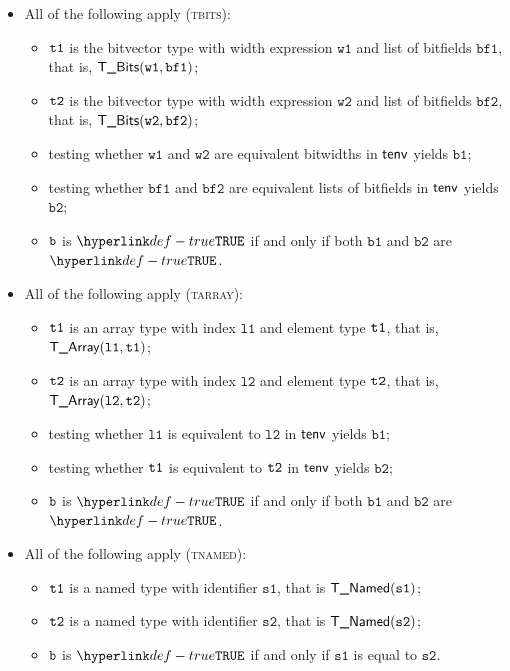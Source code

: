 \documentclass{book}
\newcommand\ProseOrTypeError[0]{\ProseTerminateAs{\TypeErrorConfig}}
\newcommand\vsone[0]{\texttt{s1}}
\newcommand\vstwo[0]{\texttt{s2}}
\newcommand\vwone[0]{\texttt{w1}}
\newcommand\vwtwo[0]{\texttt{w2}}
\newcommand\bfone[0]{\texttt{bf1}}
\newcommand\bftwo[0]{\texttt{bf2}}
\newcommand\vbone[0]{\texttt{b1}}
\newcommand\vbtwo[0]{\texttt{b2}}
\newcommand\vlone[0]{\texttt{l1}}
\newcommand\vltwo[0]{\texttt{l2}}
\begin{document}
\begin{itemize}
  \item All of the following apply (\textsc{tbits}):
  \begin{itemize}
    \item $\texttt{t1}$ is the bitvector type with width expression $\vwone$ and list of bitfields $\bfone$, that is, $\TBits(\vwone, \bfone)$;
    \item $\texttt{t2}$ is the bitvector type with width expression $\vwtwo$ and list of bitfields $\bftwo$, that is, $\TBits(\vwtwo, \bftwo)$;
    \item testing whether $\vwone$ and $\vwtwo$ are equivalent bitwidths in $\textsf{tenv}$ yields $\vbone$\ProseOrTypeError;
    \item testing whether $\bfone$ and $\bftwo$ are equivalent lists of bitfields in $\textsf{tenv}$ yields $\vbtwo$\ProseOrTypeError;
    \item $\texttt{b}$ is $\True$ if and only if both $\vbone$ and $\vbtwo$ are $\True$.
  \end{itemize}

  \item All of the following apply (\textsc{tarray}):
  \begin{itemize}
    \item $\texttt{t1}$ is an array type with index $\vlone$ and element type $\texttt{t1}$, that is, $\TArray(\vlone, \vtone)$;
    \item $\texttt{t2}$ is an array type with index $\vltwo$ and element type $\texttt{t2}$, that is, $\TArray(\vltwo, \vttwo)$;
    \item testing whether $\vlone$ is equivalent to $\vltwo$ in $\textsf{tenv}$ yields $\vbone$\ProseOrTypeError;
    \item testing whether $\texttt{t1}$ is equivalent to $\texttt{t2}$ in $\textsf{tenv}$ yields $\vbtwo$\ProseOrTypeError;
    \item $\texttt{b}$ is $\True$ if and only if both $\vbone$ and $\vbtwo$ are $\True$.
  \end{itemize}

  \item All of the following apply (\textsc{tnamed}):
  \begin{itemize}
    \item $\texttt{t1}$ is a named type with identifier $\vsone$, that is $\TNamed(\vsone)$;
    \item $\texttt{t2}$ is a named type with identifier $\vstwo$, that is $\TNamed(\vstwo)$;
    \item $\texttt{b}$ is $\True$ if and only if $\vsone$ is equal to $\vstwo$.
  \end{itemize}


\end{itemize}
\end{document}
